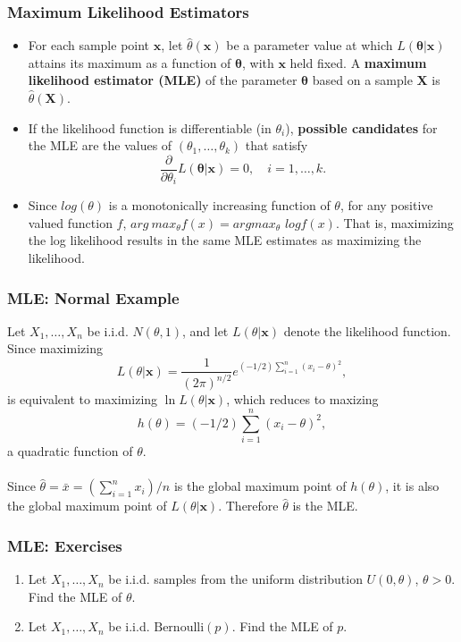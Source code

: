 \documentclass{beamer}
\begin{document}
\begin{frame}
\frametitle{Maximum Likelihood Estimators}
\begin{itemize}

\item For each sample point $\mathbf{x}$, let $\hat{\theta}(\mathbf{x})$ be a parameter value at which $L(\mathbf{\theta}|\mathbf{x})$ attains its maximum as a function of $\mathbf{\theta}$, with $\mathbf{x}$ held fixed. A \textbf{maximum likelihood estimator (MLE)} of the parameter $\mathbf{\theta}$ based on a sample $\mathbf{X}$ is $\hat{\theta}(\mathbf{X})$.
\item If the likelihood function is differentiable (in $\theta_i$), \textbf{possible candidates} for the MLE are the values of $(\theta_1,\ldots,\theta_k)$ that satisfy
$$
\frac{\partial}{\partial \theta_i} L(\mathbf{\theta}|\mathbf{x})=0, \quad i=1,\ldots,k.
$$

\item Since $log(\theta)$ is a monotonically increasing function of $\theta$, for any positive valued function $f$, $arg \ max_{\theta} f(x) = arg max_{\theta}$ $log f(x)$. That is, maximizing the log likelihood results in the same MLE estimates as maximizing the likelihood.
\end{itemize}
\end{frame}

\begin{frame}
\frametitle{MLE: Normal Example}
Let $X_1,\ldots,X_n$ be i.i.d. $N(\theta,1)$, and let $L(\theta|\mathbf{x})$ denote the likelihood function. Since maximizing
$$
L(\theta|\mathbf{x}) = \frac{1}{(2\pi)^{n/2}}e^{(-1/2)\sum_{i=1}^n(x_i-\theta)^2},
$$
is equivalent to maximizing $\ln L(\theta|\mathbf{x})$, which reduces to maxizing 
$$
h(\theta)=(-1/2)\sum_{i=1}^n(x_i-\theta)^2,
$$
a quadratic function of $\theta$.
\\~\\
Since $\hat{\theta}=\bar{x}=(\sum_{i=1}^n x_i)/n$ is the global maximum point of $h(\theta)$, it is also the global maximum point of $L(\theta|\mathbf{x})$. Therefore $\hat{\theta}$ is the MLE.
\end{frame}

\begin{frame}
\frametitle{MLE: Exercises}
\begin{enumerate}
\item Let $X_1,\ldots,X_n$ be i.i.d. samples from the uniform distribution $U(0,\theta)$, $\theta > 0$. Find the MLE of $\theta$.
\vspace*{1in}
\item Let $X_1,\ldots,X_n$ be i.i.d. $\text{Bernoulli}(p)$. Find the MLE of $p$.
\vspace*{1in}
\end{enumerate}
\end{frame}
\end{document}
